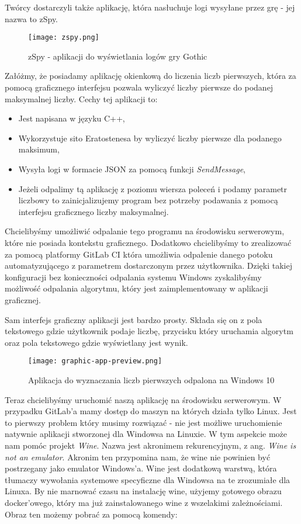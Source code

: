 Twórcy dostarczyli także aplikację, która nasłuchuje logi wysyłane przez grę - jej nazwa to zSpy.
\begin{figure}[htbp]
  \centering
  \texttt{[image: zspy.png]}
  \caption{zSpy - aplikacji do wyświetlania logów gry Gothic}
  \label{fig:gh_pages}
\end{figure}
\par
Załóżmy, że posiadamy aplikację okienkową do liczenia liczb pierwszych, która za pomocą graficznego interfejsu pozwala wyliczyć liczby pierwsze do podanej maksymalnej liczby. Cechy tej aplikacji to:
\begin{itemize}
  \item Jest napisana w języku C++,
  \item Wykorzystuje sito Eratostenesa by wyliczyć liczby pierwsze dla podanego maksimum,
  \item Wysyła logi w formacie JSON za pomocą funkcji \textit{SendMessage},
  \item Jeżeli odpalimy tą aplikację z poziomu wiersza poleceń i podamy parametr liczbowy to zainicjalizujemy program bez potrzeby podawania z pomocą interfejsu graficznego liczby maksymalnej.
\end{itemize}
Chcielibyśmy umożliwić odpalanie tego programu na środowisku serwerowym, które nie posiada kontekstu graficznego. Dodatkowo chcielibyśmy to zrealizować za pomocą platformy GitLab CI która umożliwia odpalenie danego potoku automatyzującego z parametrem dostarczonym przez użytkownika. Dzięki takiej konfiguracji bez konieczności odpalania systemu Windows zyskalibyśmy możliwość odpalania algorytmu, który jest zaimplementowany w aplikacji graficznej.
\par
Sam interfejs graficzny aplikacji jest bardzo prosty. Składa się on z pola tekstowego gdzie użytkownik podaje liczbę, przycisku który uruchamia algorytm oraz pola tekstowego gdzie wyświetlany jest wynik.
\begin{figure}[htbp]
  \centering
  \texttt{[image: graphic-app-preview.png]}
  \caption{Aplikacja do wyznaczania liczb pierwszych odpalona na Windows 10}
  \label{fig:gh_pages}
\end{figure}
\par
Teraz chcielibyśmy uruchomić naszą aplikację na środowisku serwerowym. W przypadku GitLab'a mamy dostęp do maszyn na których działa tylko Linux. Jest to pierwszy problem który musimy rozwiązać - nie jest możliwe uruchomienie natywnie aplikacji stworzonej dla Windowsa na Linuxie. W tym aspekcie może nam pomóc projekt \textit{Wine}. Nazwa jest akronimem rekurencyjnym, z ang. \textit{Wine is not an emulator}. Akronim ten przypomina nam, że wine nie powinien być postrzegany jako emulator Windows'a. Wine jest dodatkową warstwą, która tłumaczy wywołania systemowe specyficzne dla Windowsa na te zrozumiałe dla Linuxa. By nie marnować czasu na instalację wine, użyjemy gotowego obrazu docker'owego, który ma już zainstalowanego wine z wszelakimi zależnościami. Obraz ten możemy pobrać za pomocą komendy:
